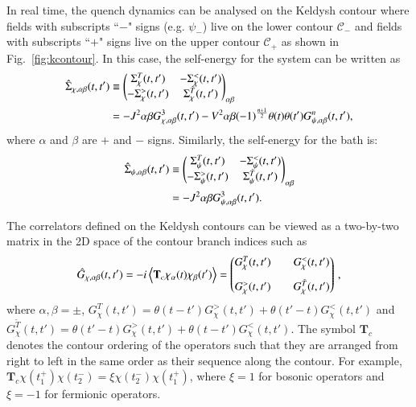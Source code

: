 In real time, the quench dynamics can be analysed on the Keldysh contour where fields with subscripts ``$-$" signs (e.g. $\psi_-$) live on the lower contour $\mathcal{C}_-$ and fields with subscripts ``$+$" signs live on the upper contour $\mathcal{C}_+$ as shown in Fig.~\ref{fig:kcontour}. In this case, the self-energy for the system can be written as
\begin{align}
\hat\Sigma_{\chi,\alpha\beta}(t,t')&\equiv\begin{pmatrix}
\Sigma_\chi^{T}(t,t')&-\Sigma_\chi^{<}(t,t')\\
-\Sigma_\chi^{>}(t,t')&\Sigma_\chi^{\tilde{T}}(t,t')
\end{pmatrix}_{\alpha\beta}\notag\\
&=-J^2\alpha \beta G^3_{\chi,\alpha\beta}(t,t')-V^2\alpha \beta (-1)^{\frac{n+1}{2}}\theta(t)\theta(t')G^{n}_{\psi,\alpha\beta}(t,t'),
\end{align}
where $\alpha$ and $\beta$ are $+$ and $-$ signs. Similarly, the self-energy for the bath is:
\begin{align}
\hat\Sigma_{\psi,\alpha\beta}(t,t')&\equiv\begin{pmatrix}
\Sigma_\psi^{T}(t,t')&-\Sigma_\psi^{<}(t,t')\\
-\Sigma_\psi^{>}(t,t')&\Sigma_\psi^{\tilde{T}}(t,t')
\end{pmatrix}_{\alpha\beta}\notag \\ &=-J^2\alpha \beta G^3_{\psi,\alpha\beta}(t,t').
\end{align}


The correlators defined on the Keldysh contours can be viewed as a two-by-two matrix in the 2D space of the contour branch indices  \cite{babadi2015far} such as
\begin{align}
\hat{G}_{\chi,\alpha\beta}(t,t')=-i\left<\mathbf{T}_c \chi_\alpha(t)\chi_\beta(t')\right>=\begin{pmatrix}
G^{T}_\chi(t,t')&&G^{<}_\chi(t,t')\vspace{3mm}\\ 
G^{>}_\chi(t,t')&&G^{\tilde{T}}_\chi(t,t')
\end{pmatrix}\,,
\label{eq:grn}
\end{align}
where $\alpha,\beta=\pm$, $G^{T}_\chi(t,t')=\theta(t-t')G^{>}_\chi(t,t')+\theta(t'-t)G^{<}_\chi(t,t')$ and $G^{\tilde{T}}_\chi(t,t')=\theta(t'-t)G^{>}_\chi(t,t')+\theta(t-t')G^{<}_\chi(t,t')$.
The symbol $\mathbf{T}_c$ denotes the contour ordering of the  operators such that they are arranged from right to left in the same order as their sequence along the contour. For example, $\mathbf{T}_c \chi(t^+_1) \chi(t^-_2)=\xi \chi(t^-_2) \chi(t^+_1)$, where $\xi=1$ for bosonic operators and $\xi=-1$ for fermionic operators. 

